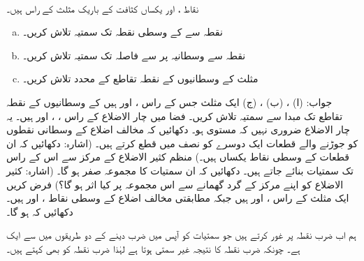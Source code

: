 \\
نقاط ،  اور   یکساں کثافت کے باریک مثلث کے راس ہیں۔ 
\begin{enumerate}[a.]
\item
نقطہ  سے  کے وسطی نقطہ  تک سمتیہ تلاش کریں۔
\item
نقطہ  سے وسطانیہ  پر  سے  فاصلہ تک سمتیہ تلاش کریں۔
\item
مثلث  کے وسطانیوں کے نقطہ تقاطع کے محدد تلاش کریں۔
\end{enumerate}
جواب:\quad
(ا) ، (ب) ، (ج) 
ایک مثلث جس کے راس ،  اور  ہیں کے وسطانیوں کے نقطہ تقاطع تک مبدا سے سمتیہ تلاش کریں۔ 
فضا میں چار الاضلاع کے راس ، ،  اور  ہیں۔ یہ چار الاضلاع ضروری نہیں کہ مستوی ہو۔ دکھائیں کہ مخالف اضلاع کے وسطانی نقطوں کو جوڑنے والے قطعات ایک دوسرے کو نصف میں قطع کرتے ہیں۔ (اشارہ: دکھائیں کہ ان قطعات کے وسطی نقاط یکساں ہیں۔)
منظم  کثیر الاضلاع کے مرکز سے اس کے راس تک سمتیات بنائے جاتے ہیں۔ دکھائیں کہ ان سمتیات کا مجموعہ صفر ہو گا۔ (اشارہ: کثیر الاضلاع کو اپنے مرکز کے گرد گھمانے سے اس مجموعہ پر کیا اثر ہو گا؟)
فرض کریں ایک مثلث کے راس ،  اور  ہیں جبکہ مطابقتی مخالف اضلاع کے وسطی نقاط ،  اور  ہیں۔ دکھائیں کہ  ہو گا۔

ہم اب ضرب نقطہ پر غور کرتے ہیں جو سمتیات کو آپس میں ضرب دینے کے دو طریقوں میں سے ایک ہے۔ چونکہ ضرب نقطہ کا نتیجہ غیر سمتی ہوتا ہے لہٰذا ضرب نقطہ کو  بھی کہتے ہیں۔

